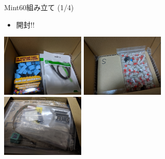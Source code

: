 \documentclass[cjk,dvipdfmx,10pt,compress,fragile%
hyperref={bookmarks=true,bookmarksnumbered=true,bookmarksopen=false,%
colorlinks=false,%
pdftitle={第 134 回 関西 Debian 勉強会},%
pdfauthor={小林},%
pdfsubject={資料},%
}]{beamer}
\begin{document}
\begin{frame}[fragile,t]{Mint60組み立て (1/4)}
 \begin{itemize}
  \item 開封!!
 \end{itemize}
 \begin{center}
 \includegraphics[keepaspectratio,height=3cm]{./img/mint60-unpack-01.jpg} \hspace*{1zw}
 \includegraphics[keepaspectratio,height=3cm]{./img/mint60-unpack-02.jpg} \\
 \includegraphics[keepaspectratio,height=3cm]{./img/mint60-unpack-03.jpg}
 \end{center}
\end{frame}
\end{document}
